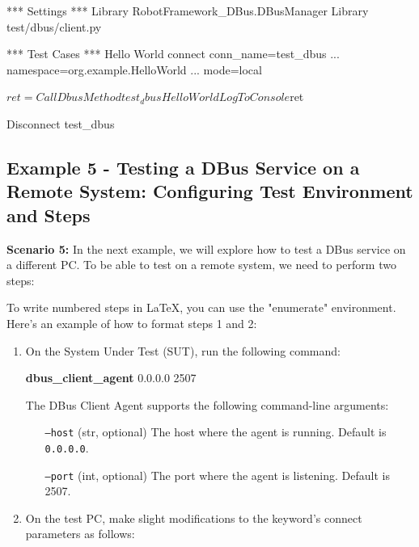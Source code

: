\begin{robotcode}
*** Settings ***
Library    RobotFramework_DBus.DBusManager
Library    test/dbus/client.py

*** Test Cases ***
Hello World
   connect    conn_name=test_dbus
   ...        namespace=org.example.HelloWorld
   ...        mode=local

   ${ret}=    Call Dbus Method    test_dbus    Hello    World
   Log To Console    ${ret}

   Disconnect    test_dbus
\end{robotcode}


\hypertarget{description-example5}{%
\subsection{\texorpdfstring{\textbf{Example 5 - Testing a DBus Service on a Remote System: Configuring Test Environment and Steps}}{Example 5 - Testing a DBus Service on a Remote System: Configuring Test Environment and Steps}}\label{description-example5}}

\textbf{Scenario 5:}
In the next example, we will explore how to test a DBus service on a different PC. To be able to test on a remote system, we need to perform two steps:

To write numbered steps in LaTeX, you can use the "enumerate" environment. Here's an example of how to format steps 1 and 2:

\begin{enumerate}
\item On the System Under Test (SUT), run the following command:

	\textbf{dbus\_client\_agent}  0.0.0.0  2507

		The DBus Client Agent supports the following command-line arguments:

		\begin{itemize}
			\setlength{\itemindent}{10em}
			\item [\texttt{--host} (str, optional)] The host where the agent is running. Default is \texttt{0.0.0.0}.
			\item [\texttt{--port} (int, optional)] The port where the agent is listening. Default is 2507.
		\end{itemize}

\item On the test PC, make slight modifications to the keyword's connect parameters as follows:
\end{enumerate}

